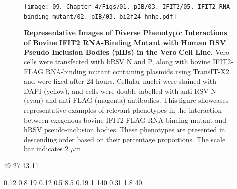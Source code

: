 \begin{figure}
    \centering
    \texttt{[image: 09. Chapter 4/Figs/01. pIB/03. IFIT2/05. IFIT2-RNA binding mutant/02. pIB/03. bi2f24-hnhp.pdf]}
    \caption[Representative Images of Diverse Phenotypic Interactions of Bovine IFIT2 RNA-Binding Mutant with Human RSV Pseudo Inclusion Bodies (pIBs) in the Vero Cell Line.]{\textbf{Representative Images of Diverse Phenotypic Interactions of Bovine IFIT2 RNA-Binding Mutant with Human RSV Pseudo Inclusion Bodies (pIBs) in the Vero Cell Line.}  Vero cells were transfected with bRSV N and P, along with bovine IFIT2-FLAG RNA-binding mutant containing plasmids using TransIT-X2 and were fixed after 24 hours. Cellular nuclei were stained with DAPI (yellow), and cells were double-labelled with anti-RSV N (cyan) and anti-FLAG (magenta) antibodies. This figure showcases representative examples of relevant phenotypes in the interaction between exogenous bovine IFIT2-FLAG RNA-binding mutant and hRSV pseudo-inclusion bodies. These phenotypes are presented in descending order based on their percentage proportions. The scale bar indicates 2 \(\mu \mbox{m}\).}
    \label{fig:Representative Images of Diverse Phenotypic Interactions of Bovine IFIT2 RNA-Binding Mutant with Human RSV Pseudo Inclusion Bodies (pIBs) in the Vero Cell Line}
\end{figure}

49 27 13 11

0.12 0.8 19
0.12 0.5 8.5
0.19 1 140
0.31 1.8 40

